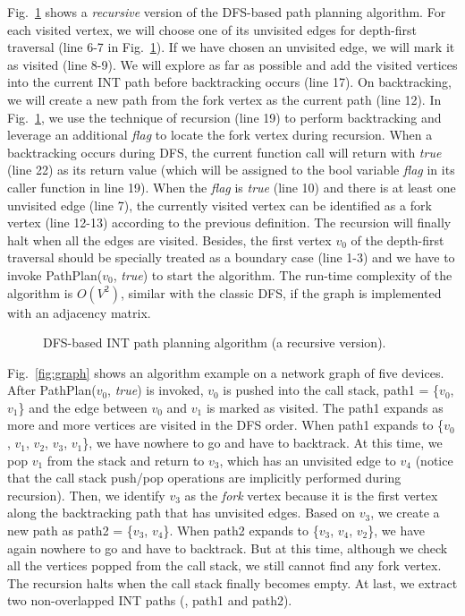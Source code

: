 Fig.~\ref{fig:dfs} shows a \emph{recursive} version of the DFS-based path planning algorithm. For each visited vertex, we will choose one of its unvisited edges for depth-first traversal (line 6-7 in Fig.~\ref{fig:dfs}). If we have chosen an unvisited edge, we will mark it as visited (line 8-9). We will explore as far as possible and add the visited vertices into the current INT path before backtracking occurs (line 17). On backtracking, we will create a new path from the fork vertex as the current path (line 12). In Fig.~\ref{fig:dfs}, we use the technique of recursion (line 19) to perform backtracking and leverage an additional \emph{flag} to locate the fork vertex during recursion. When a backtracking occurs during DFS, the current function call will return with \emph{true} (line 22) as its return value (which will be assigned to the bool variable \emph{flag} in its caller function in line 19). When the \emph{flag} is \emph{true} (line 10) and there is at least one unvisited edge (line 7), the currently visited vertex can be identified as a fork vertex (line 12-13) according to the previous definition. The recursion will finally halt when all the edges are visited. Besides, the first vertex $v_0$ of the depth-first traversal should be specially treated as a boundary case (line 1-3) and we have to invoke PathPlan($v_0$, \emph{true}) to start the algorithm. The run-time complexity of the algorithm is $O(V^2)$, similar with the classic DFS, if the graph is implemented with an adjacency matrix.

\begin{figure}
\centering
{}
\vspace{-0.2cm}
\caption{DFS-based INT path planning algorithm (a recursive version).}
\label{fig:dfs}
\vspace{-0.2cm}
\end{figure}

Fig.~\ref{fig:graph} shows an algorithm example on a network graph of five devices. After PathPlan($v_0$, \emph{true}) is invoked, $v_0$ is pushed into the call stack, path1 = \{$v_0$, $v_1$\} and the edge between $v_0$ and $v_1$ is marked as visited. The path1 expands as more and more vertices are visited in the DFS order. When path1 expands to \{$v_0$, $v_1$, $v_2$, $v_3$, $v_1$\}, we have nowhere to go and have to backtrack. At this time, we pop $v_1$ from the stack and return to $v_3$, which has an unvisited edge to $v_4$ (notice that the call stack push/pop operations are implicitly performed during recursion). Then, we identify $v_3$ as the \emph{fork} vertex because it is the first vertex along the backtracking path that has unvisited edges. Based on $v_3$, we create a new path as path2 = \{$v_3$, $v_4$\}. When path2 expands to \{$v_3$, $v_4$, $v_2$\}, we have again nowhere to go and have to backtrack. But at this time, although we check all the vertices popped from the call stack, we still cannot find any fork vertex. The recursion halts when the call stack finally becomes empty. At last, we extract two non-overlapped INT paths (\ie, path1 and path2).


